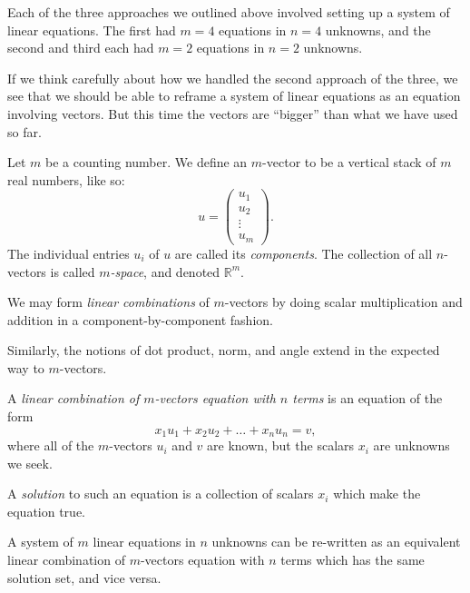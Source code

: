 \documentclass[00-livre-main.tex]{subfiles}
\begin{document}
Each of the three approaches we outlined above involved setting up a system of linear equations. The first had $m=4$ equations in $n=4$ unknowns, and the second and third each had $m=2$ equations in $n=2$ unknowns.

If we think carefully about how we handled the second approach of the three, we see that we should be able to reframe a system of linear equations as an equation involving vectors. But this time the vectors are ``bigger'' than what we have used so far.

\begin{definition}
Let $m$ be a counting number. We define an $m$-vector to be a vertical stack of $m$ real numbers, like so:
\[
u = \begin{pmatrix} u_1 \\ u_2 \\ \vdots \\ u_m \end{pmatrix} .
\]
The individual entries $u_i$ of $u$ are called its \emph{components}.
The collection of all $n$-vectors is called \emph{$m$-space}, and denoted $\mathbb{R}^m$.

We may form \emph{linear combinations} of $m$-vectors by doing scalar multiplication and addition in a component-by-component fashion.

Similarly, the notions of dot product, norm, and angle extend in the expected way to $m$-vectors.
\end{definition}



\begin{definition}
A \emph{linear combination of $m$-vectors equation with $n$ terms} is an equation of the form
\[
x_1 u_1 + x_2 u_2 + \dots + x_n u_n = v,
\]
where all of the $m$-vectors $u_i$ and $v$ are known, but the scalars $x_i$ are unknowns we seek.

A \emph{solution} to such an equation is a collection of scalars $x_i$ which make the equation true.
\end{definition}


\begin{theorem}
A system of $m$ linear equations in $n$ unknowns can be re-written as an equivalent linear combination of $m$-vectors equation with $n$ terms which has the same solution set, and vice versa.
\end{theorem}
\end{document}
